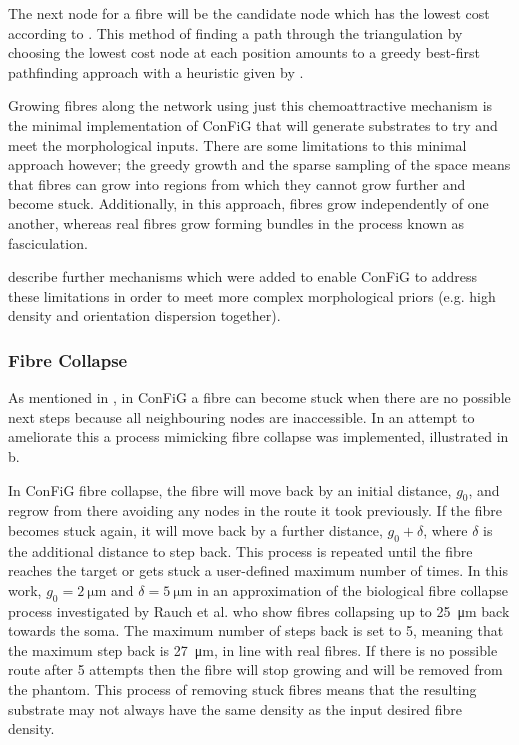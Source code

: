 The next node for a fibre will be the candidate node which has the lowest cost according to . This method of finding a path through the triangulation by choosing the lowest cost node at each position amounts to a greedy best-first pathfinding approach with a heuristic given by .

Growing fibres along the network using just this chemoattractive mechanism is the minimal implementation of \ac{ConFiG} that will generate substrates to try and meet the morphological inputs. There are some limitations to this minimal approach however; the greedy growth and the sparse sampling of the space means that fibres can grow into regions from which they cannot grow further and become stuck. Additionally, in this approach, fibres grow independently of one another, whereas real fibres grow forming bundles in the process known as fasciculation.

 describe further mechanisms which were added to enable \ac{ConFiG} to address these limitations in order to meet more complex morphological priors (e.g. high density and orientation dispersion together).

\subsubsection{Fibre Collapse}
\label{sec:config_fibre_collapse}
As mentioned in , in \ac{ConFiG} a fibre can become stuck when there are no possible next steps because all neighbouring nodes are inaccessible. In an attempt to ameliorate this a process mimicking fibre collapse was implemented, illustrated in b.

In \ac{ConFiG} fibre collapse, the fibre will move back by an initial distance, $g_0$, and regrow from there avoiding any nodes in the route it took previously. If the fibre becomes stuck again, it will move back by a further distance, $g_0+ \delta$, where $\delta$ is the additional distance to step back. This process is repeated until the fibre reaches the target or gets stuck a user-defined maximum number of times. In this work, $g_0=\SI{2}{\micro\metre}$  and $\delta=\SI{5}{\micro\metre}$ in an approximation of the biological fibre collapse process investigated by Rauch et al. \cite{Rauch2013} who show fibres collapsing up to \SI{25}{\micro\metre} back towards the soma. The maximum number of steps back is set to 5, meaning that the maximum step back is \SI{27}{\micro\metre}, in line with real fibres. If there is no possible route after 5 attempts then the fibre will stop growing and will be removed from the phantom. This process of removing stuck fibres means that the resulting substrate may not always have the same density as the input desired fibre density.

